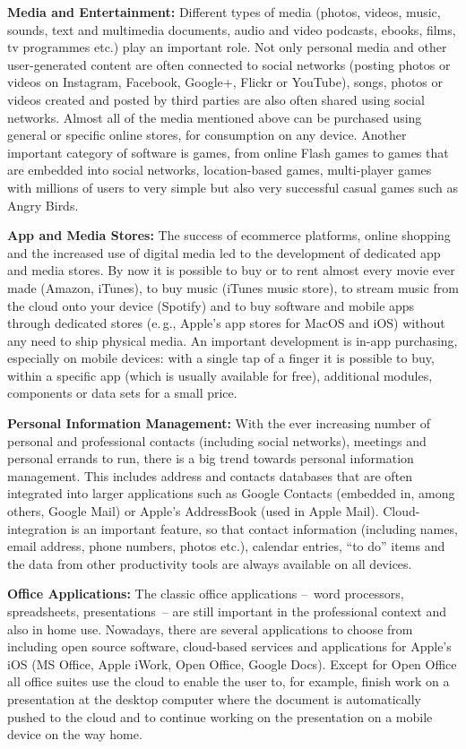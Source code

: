 \documentclass[10pt, plain]{../../metanetpaper}
\begin{document}
\begin{multicols}{2}
\textbf{Media and Entertainment:} Different types of media (photos, videos, music, sounds, text and multimedia documents, audio and video podcasts, ebooks, films, tv programmes etc.) play an important role. Not only personal media and other user-generated content are often connected to social networks (posting photos or videos on Instagram, Facebook, Google+, Flickr or YouTube), songs, photos or videos created and posted by third parties are also often shared using social networks. Almost all of the media mentioned above can be purchased using general or specific online stores, for consumption on any device. Another important category of software is games, from online Flash games to games that are embedded into social networks, location-based games, multi-player games with millions of users to very simple but also very successful casual games such as Angry Birds.

\textbf{App and Media Stores:} The success of ecommerce platforms, online shopping and the increased use of digital media led to the development of dedicated app and media stores. By now it is possible to buy or to rent almost every movie ever made (Amazon, iTunes), to buy music (iTunes music store), to stream music from the cloud onto your device (Spotify) and to buy software and mobile apps through dedicated stores (e.\,g., Apple's app stores for MacOS and iOS) without any need to ship physical media. An important development is in-app purchasing, especially on mobile devices: with a single tap of a finger it is possible to buy, within a specific app (which is usually available for free), additional modules, components or data sets for a small price.

\textbf{Personal Information Management:} With the ever increasing number of personal and professional contacts (including social networks), meetings and personal errands to run, there is a big trend towards personal information management. This includes address and contacts databases that are often integrated into larger applications such as Google Contacts (embedded in, among others, Google Mail) or Apple's AddressBook (used in Apple Mail). Cloud-integration is an important feature, so that contact information (including names, email address, phone numbers, photos etc.), calendar entries, ``to do'' items and the data from other productivity tools are always available on all devices. 

\textbf{Office Applications:} The classic office applications --~word processors, spreadsheets, presentations~-- are still important in the professional context and also in home use. Nowadays, there are several applications to choose from including open source software, cloud-based services and applications for Apple's iOS (MS Office, Apple iWork, Open Office, Google Docs). Except for Open Office all office suites use the cloud to enable the user to, for example, finish work on a presentation at the desktop computer where the document is automatically pushed to the cloud and to continue working on the presentation on a mobile device on the way home.


\end{multicols}
\end{document}
